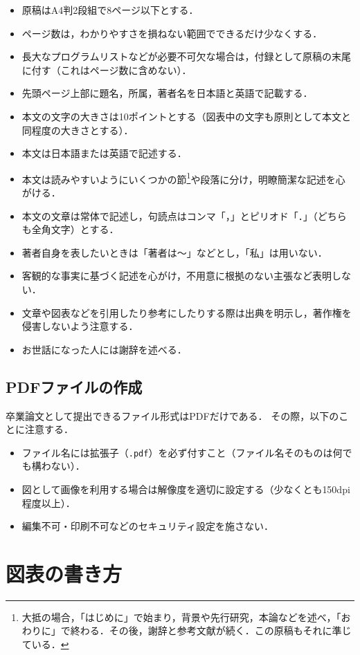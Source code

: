 \documentclass[a4paper,twocolumn,10pt]{ltjsarticle}
\begin{document}
\begin{itemize}
 \item 原稿はA4判2段組で8ページ以下とする．
 \item ページ数は，わかりやすさを損ねない範囲でできるだけ少なくする．
 \item 長大なプログラムリストなどが必要不可欠な場合は，付録として原稿の末尾に付す（これはページ数に含めない）．
 \item 先頭ページ上部に題名，所属，著者名を日本語と英語で記載する．
 \item 本文の文字の大きさは10ポイントとする（図表中の文字も原則として本文と同程度の大きさとする）．
 \item 本文は日本語または英語で記述する．
 \item 本文は読みやすいようにいくつかの節\footnote{大抵の場合，「はじめに」で始まり，背景や先行研究，本論などを述べ，「おわりに」で終わる．その後，謝辞と参考文献が続く．この原稿もそれに準じている．}や段落に分け，明瞭簡潔な記述を心がける．
 \item 本文の文章は常体で記述し，句読点はコンマ「，」とピリオド「．」（どちらも全角文字）とする．
 \item 著者自身を表したいときは「著者は〜」などとし，「私」は用いない．
 \item 客観的な事実に基づく記述を心がけ，不用意に根拠のない主張など表明しない．
 \item 文章や図表などを引用したり参考にしたりする際は出典を明示し，著作権を侵害しないよう注意する．
 \item お世話になった人には謝辞を述べる．
\end{itemize}

\subsection{PDFファイルの作成}

卒業論文として提出できるファイル形式はPDFだけである．
その際，以下のことに注意する．

\begin{itemize}
 \item ファイル名には拡張子（{\tt .pdf}）を必ず付すこと（ファイル名そのものは何でも構わない）．
 \item 図として画像を利用する場合は解像度を適切に設定する（少なくとも150dpi程度以上）．
 \item 編集不可・印刷不可などのセキュリティ設定を施さない．
\end{itemize}

\section{図表の書き方}
\end{document}
